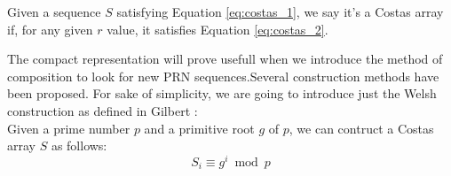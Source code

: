 \begin{definition}
  Given a sequence $S$ satisfying Equation \ref{eq:costas_1}, we say it's a
  Costas array if, for any given $r$ value, it satisfies Equation
  \ref{eq:costas_2}.
\end{definition}

The compact representation will prove usefull when we introduce the method of
composition to look for new PRN sequences.Several construction methods have
been proposed. For sake of simplicity, we are going to introduce just the Welsh
construction as defined in Gilbert \cite{gilbert_costas}:\\

Given a prime number $p$ and a primitive root $g$ of $p$, we can contruct a
Costas array $S$ as follows:
\begin{equation}
  S_{i} \equiv g^{i} \bmod p
\end{equation}

